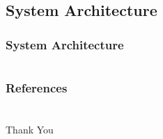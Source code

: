 \documentclass[t]{beamer}
\begin{document}
\subsection{System Architecture}
\begin{frame}[c]
    \frametitle{System Architecture}
    \begin{figure}
        \centering
        \def\svgwidth{\columnwidth}
        \resizebox{1.0\textwidth}{!}{}
    \end{figure}
\end{frame}

\section{}
\begin{frame}
    \frametitle{References}
    \nocite{*}
    \printbibliography     
\end{frame}

\section{}
\begin{frame}[c]
    \centering
    \Huge Thank You
\end{frame}
\end{document}
